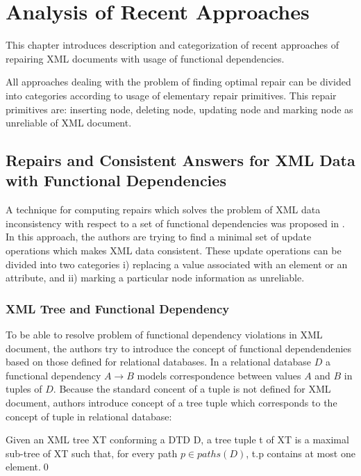 \chapter{Analysis of Recent Approaches}

This chapter introduces description and categorization of recent approaches of repairing XML documents with usage of functional dependencies.

All approaches dealing with the problem of finding optimal repair can be divided into categories according to usage of elementary repair primitives. This repair primitives are: inserting node, deleting node, updating node and marking node as unreliable of XML document.

\section[Repairs and Consistent Answers for XML Data]{Repairs and Consistent Answers for XML Data with Functional Dependencies}

A technique for computing repairs which solves the problem of XML data inconsistency with respect to a set of functional dependencies was proposed in \cite{RepAndConsistentAnswer}. In this approach, the authors are trying to find a minimal set of update operations which makes XML data consistent. These update operations can be divided into two categories i) replacing a value associated with an element or an attribute, and ii) marking a particular node information as unreliable.

\subsection{XML Tree and Functional Dependency}

To be able to resolve problem of functional dependency violations in XML document, the authors try to introduce the concept of functional dependendenies based on those defined for relational databases. In a relational database $D$ a functional dependency $A \rightarrow B$ models correspondence between values $A$ and $B$ in tuples of $D$. Because the standard concent of a tuple is not defined for XML document, authors introduce concept of a tree tuple which corresponds to the concept of tuple in relational database:

\begin{define}
Given an XML tree XT conforming a DTD D, a tree tuple t of XT is a maximal sub-tree of XT such that, for every path $p \in paths(D)$, t.p contains at most one element.\qed
\end{define}


